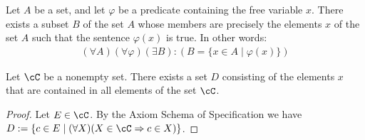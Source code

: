     \begin{axiom}
        Let $A$ be a set, and let $\varphi$ be a predicate containing the free variable $x$. There exists a subset $B$ of the set $A$ whose members are precisely the elements $x$ of the set $A$ such that the sentence $\varphi(x)$ is true. In other words:
            \begin{equation*}
            \begin{split}
                (\forall A)(\forall \varphi)(\exists B):(B = \{x \in A \mid \varphi(x)\})
            \end{split}
            \end{equation*}
    \end{axiom}

    \begin{proposition}
        Let $\cC$ be a nonempty set. There exists a set $D$ consisting of the elements $x$ that are contained in all elements of the set $\cC$.
    \end{proposition}
        \begin{proof}
            Let $E \in \cC$. By the Axiom Schema of Specification we have $D := \{c \in E \mid (\forall X)(X \in \cC \Rightarrow c \in X)\}$.
        \end{proof}

